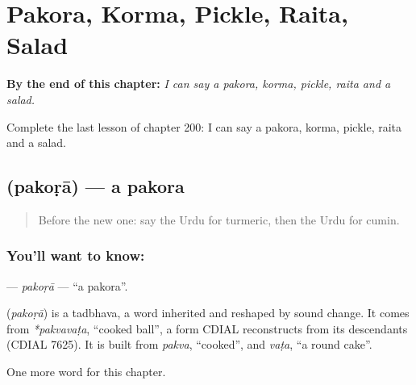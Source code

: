 
\chapter{Pakora, Korma, Pickle, Raita, Salad}
\label{ch:ur-pakora-korma-pickle-raita-salad}

\begin{chapteropening}
\textbf{By the end of this chapter:} \emph{I can say a pakora, korma, pickle, raita and a salad.}

Complete the last lesson of chapter 200: I can say a pakora, korma, pickle, raita and a salad.
\end{chapteropening}

\section[\texorpdfstring{\ur{پکوڑا} (pakoṛā)}{پکوڑا (pakoṛā)}]{ (pakoṛā) — a pakora}

\label{lesson:UR-C200-pakora}



\begin{quote}
Before the new one: say the Urdu for turmeric, then the Urdu for cumin.
\end{quote}

\subsection*{You'll want to know: }
\textbf{} — \emph{pakoṛā} — \textquotedblleft{}a pakora\textquotedblright{}.

\begin{cousinweb}
\textbf{} (\emph{pakoṛā}) is a tadbhava, a word inherited and reshaped by sound change. It comes from \emph{*pakvavaṭa}, \textquotedblleft{}cooked ball\textquotedblright{}, a form CDIAL reconstructs from its descendants (CDIAL 7625). It is built from \emph{pakva}, \textquotedblleft{}cooked\textquotedblright{}, and \emph{vaṭa}, \textquotedblleft{}a round cake\textquotedblright{}.
\end{cousinweb}

\begin{grammarlens}[title={What you've built}]
One more word for this chapter.
\end{grammarlens}

